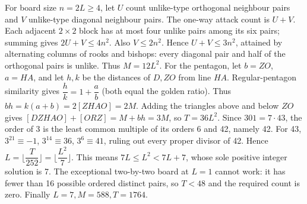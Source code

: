 For board size $n=2L\ge4$, let $U$ count unlike-type orthogonal neighbour pairs and $V$ unlike-type diagonal neighbour pairs. The one-way attack count is $U+V$. Each adjacent $2\times2$ block has at most four unlike pairs among its six pairs; summing gives $2U+V\le4n^2$. Also $V\le2n^2$. Hence $U+V\le3n^2$, attained by alternating columns of rooks and bishops: every diagonal pair and half of the orthogonal pairs is unlike. Thus $M=12L^2$.
For the pentagon, let $b=ZO$, $a=HA$, and let $h,k$ be the distances of $D,ZO$ from line $HA$. Regular-pentagon similarity gives $\dfrac{h}{k}=1+\dfrac{a}{b}$ (both equal the golden ratio). Thus $bh=k(a+b)=2[ZHAO]=2M$. Adding the triangles above and below $ZO$ gives $[DZHAO]+[ORZ]=M+bh=3M$, so $T=36L^2$.
Since $301=7\cdot43$, the order of 3 is the least common multiple of its orders 6 and 42, namely 42. For 43, $3^{21}\equiv-1$, $3^{14}\equiv36$, $3^6\equiv41$, ruling out every proper divisor of 42. Hence $L=\lfloor \dfrac{T}{252}\rfloor=\lfloor \dfrac{L^2}{7}\rfloor$. This means $7L\le L^2<7L+7$, whose sole positive integer solution is 7. The exceptional two-by-two board at $L=1$ cannot work: it has fewer than 16 possible ordered distinct pairs, so $T<48$ and the required count is zero. Finally $\boxed{L=7,M=588,T=1764}$.

